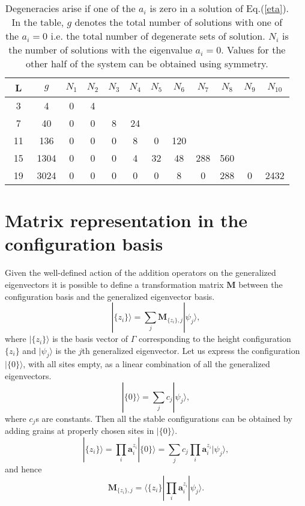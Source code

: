 \documentclass[11pt,a4paper]{book}
\begin{document}
\begin{table}
  \begin{center}
    \begin{tabular}{|c||c||c|c|c|c|c|c|c|c|c|c|}
      \hline
      ~L~ & $g$ & $N_1$ & $N_2$ & $N_3$ & $N_4$ & $N_5$ & $N_6$ & $N_7$ &
$N_8$ & $N_9$ & $N_{10}$ \\
      \hline
      3 & 4 & 0 & 4 & & & & & & & &  \\
      \hline
      7 & 40 & 0 & 0 & 8 & 24 & & & & & & \\
      \hline
      11 & 136 & 0 & 0 & 0 & 8 & 0 & 120 & & & & \\
      \hline
      15 & 1304 & 0 & 0 &  0 & 4 & 32 & 48 & 288 & 560 & & \\
      \hline
      19 & 3024 & 0 & 0 & 0 & 0 & 0 & 8 & 0 & 288 & 0 & 2432 \\
      \hline
    \end{tabular}
    \caption{Degeneracies arise if one of the $a_i$ is
zero in a solution of
Eq.(\ref{eta}). In the table, $g$ denotes the total number of solutions with one of the $a_i=0$  i.e. the
total number of degenerate sets of solution. $N_i$ is the
number of solutions with the eigenvalue $a_i=0$.
Values for the other half of the system can be obtained using symmetry.}
  \end{center}
  \label{first}
\end{table}

\section{Matrix representation in the configuration basis}\label{sec:ch5.5}
Given the well-defined action of the addition operators on the
generalized eigenvectors it is
possible to define a transformation
matrix $\mathbf{M}$ between the  configuration basis and the generalized 
eigenvector basis. 
\begin{equation}
|\{z_i\}\rangle = \sum_{j}\mathbf{M}_{\{z_i\},j}|\psi_j\rangle,
\end{equation}
where $|\{z_i\}\rangle$ is the  basis vector of $\Gamma$  corresponding to 
the height configuration
$\{z_i\}$ and $|\psi_j\rangle$ is the $j$th generalized eigenvector. Let us
express the configuration $|\{0\}\rangle$, with all sites empty, as a 
linear combination of all the generalized eigenvectors.
\begin{equation}
  |\{0\}\rangle = \sum_{j}c_j|\psi_j\rangle,
\end{equation}
where $c_j$s are constants. Then all the stable configurations can be
obtained by adding grains at properly chosen sites in $|\{0\}\rangle$.
\begin{equation}
  |\{z_i\}\rangle = \prod_i\mathbf{a}_i^{z_i}|\{0\}\rangle =
\sum_jc_j\prod_i\mathbf{a}_i^{z_i}|\psi_j\rangle,
\end{equation}
and hence
\begin{equation}
\mathbf{M}_{\{z_i\},j}=\langle \{z_i\}|\prod_i\mathbf{a}_i^{z_i}|\psi_j\rangle.
\end{equation}
\end{document}
